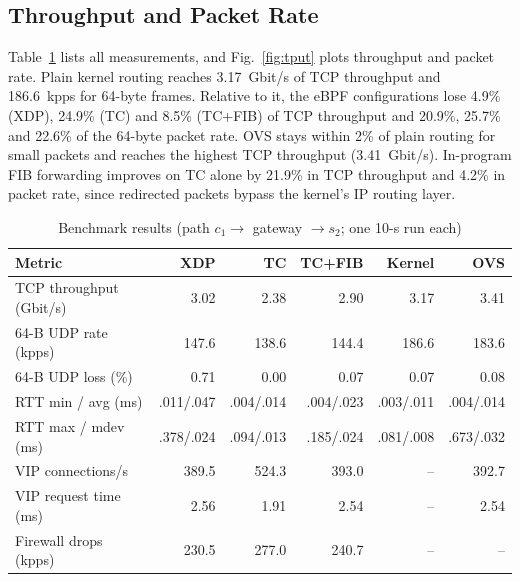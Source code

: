 \documentclass[conference]{IEEEtran}
\begin{document}
\subsection{Throughput and Packet Rate}
Table~\ref{tab:perf} lists all measurements, and Fig.~\ref{fig:tput} plots
throughput and packet rate. Plain kernel routing reaches 3.17~Gbit/s of TCP
throughput and 186.6~kpps for 64-byte frames. Relative to it, the eBPF
configurations lose 4.9\% (XDP), 24.9\% (TC) and 8.5\% (TC+FIB) of TCP
throughput and 20.9\%, 25.7\% and 22.6\% of the 64-byte packet rate. OVS
stays within 2\% of plain routing for small packets and reaches the highest
TCP throughput (3.41~Gbit/s). In-program FIB forwarding improves on TC alone
by 21.9\% in TCP throughput and 4.2\% in packet rate, since redirected
packets bypass the kernel's IP routing layer.

\begin{table}[t]
\caption{Benchmark results (path $c_1 \to$ gateway $\to s_2$; one 10-s run each)}
\label{tab:perf}
\centering\scriptsize
\setlength{\tabcolsep}{3pt}
\begin{tabular}{@{}lrrrrr@{}}
\toprule
Metric & XDP & TC & TC+FIB & Kernel & OVS \\
\midrule
TCP throughput (Gbit/s) & 3.02 & 2.38 & 2.90 & 3.17 & 3.41 \\
64-B UDP rate (kpps)    & 147.6 & 138.6 & 144.4 & 186.6 & 183.6 \\
64-B UDP loss (\%)      & 0.71 & 0.00 & 0.07 & 0.07 & 0.08 \\
RTT min / avg (ms)      & .011/.047 & .004/.014 & .004/.023 & .003/.011 & .004/.014 \\
RTT max / mdev (ms)     & .378/.024 & .094/.013 & .185/.024 & .081/.008 & .673/.032 \\
VIP connections/s       & 389.5 & 524.3 & 393.0 & -- & 392.7 \\
VIP request time (ms)   & 2.56 & 1.91 & 2.54 & -- & 2.54 \\
Firewall drops (kpps)   & 230.5 & 277.0 & 240.7 & -- & -- \\
\bottomrule
\end{tabular}
\end{table}
\end{document}
